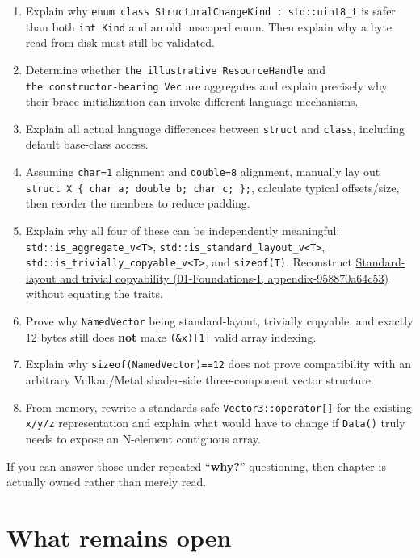 \begin{enumerate}
\item
  Explain why \texttt{enum\ class\ StructuralChangeKind\ :\ std::uint8\_t} is safer than both \texttt{int\ Kind} and an old unscoped enum. Then explain why a byte read from disk must still be validated.
\item
  Determine whether \texttt{the\ illustrative\ ResourceHandle} and \texttt{the\ constructor-bearing\ Vec} are aggregates and explain precisely why their brace initialization can invoke different language mechanisms.
\item
  Explain all actual language differences between \texttt{struct} and \texttt{class}, including default base-class access.
\item
  Assuming \texttt{char=1} alignment and \texttt{double=8} alignment, manually lay out \texttt{struct\ X\ \{\ char\ a;\ double\ b;\ char\ c;\ \};}, calculate typical offsets/size, then reorder the members to reduce padding.
\item
  Explain why all four of these can be independently meaningful: \texttt{std::is\_aggregate\_v\textless{}T\textgreater{}}, \texttt{std::is\_standard\_layout\_v\textless{}T\textgreater{}}, \texttt{std::is\_trivially\_copyable\_v\textless{}T\textgreater{}}, and \texttt{sizeof(T)}. Reconstruct \href{../01-Foundations-I/main.pdf\#nameddest=appendix-958870a64c53}{Standard-layout and trivial copyability (01-Foundations-I, appendix-958870a64c53)} without equating the traits.
\item
  Prove why \texttt{NamedVector} being standard-layout, trivially copyable, and exactly 12 bytes still does \textbf{not} make \texttt{(\&x){[}1{]}} valid array indexing.
\item
  Explain why \texttt{sizeof(NamedVector)==12} does not prove compatibility with an arbitrary Vulkan/Metal shader-side three-component vector structure.
\item
  From memory, rewrite a standards-safe \texttt{Vector3::operator{[}{]}} for the existing \texttt{x/y/z} representation and explain what would have to change if \texttt{Data()} truly needs to expose an N-element contiguous array.
\end{enumerate}

If you can answer those under repeated ``\textbf{why?}'' questioning, then chapter is actually owned rather than merely read.

\section{What remains open}\label{05-engine-i-ch004-what-remains-open}

